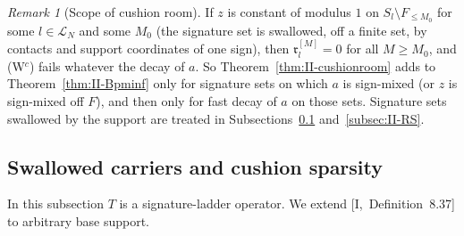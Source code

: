 \documentclass[10pt]{amsart}
\theoremstyle{definition}
\theoremstyle{remark}
\newtheorem{remark}[theorem]{Remark}
\begin{document}
\begin{remark}[Scope of cushion room]\label{rem:II-cushionroom}
If $z$ is constant of modulus $1$ on $S_l\setminus F_{\le M_0}$ for some $l\in\mathcal L_N$
and some $M_0$ (the signature set is swallowed, off a finite set, by contacts
and support coordinates of one sign), then $\mathfrak r^{[M]}_l=0$ for all
$M\ge M_0$, and \textup{(W$^c$)} fails whatever the decay of $a$.  So
Theorem~\ref{thm:II-cushionroom} adds to Theorem~\ref{thm:II-Bpminf} only
for signature sets on which $a$ is sign-mixed (or $z$ is sign-mixed off
$F$), and then only for fast decay of $a$ on those sets.  Signature sets
swallowed by the support are treated in Subsections~\ref{subsec:II-R1}
and~\ref{subsec:II-RS}.
\end{remark}

\subsection{Swallowed carriers and cushion sparsity}\label{subsec:II-R1}

In this subsection $T$ is a signature-ladder operator.  We extend
[I,~Definition~8.37] to arbitrary base support.
\end{document}

